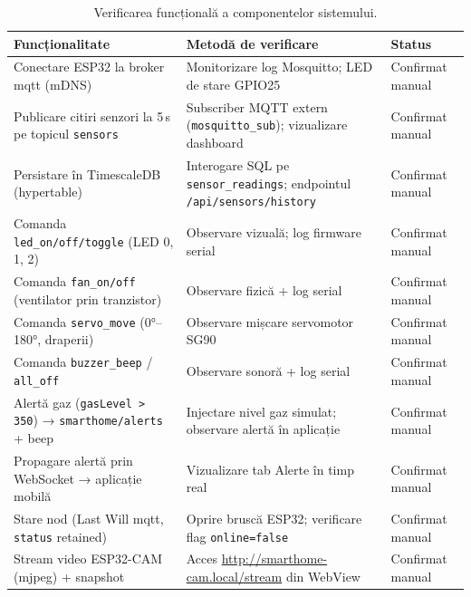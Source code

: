 \begin{table}[H]
  \centering
  \caption{Verificarea funcțională a componentelor sistemului.}
  \label{tab:verif-functionala}
  \small
  \begin{tabular}{p{4.8cm} p{5.4cm} p{2.6cm}}
    \toprule
    \textbf{Funcționalitate} & \textbf{Metodă de verificare} & \textbf{Status} \\
    \midrule
    Conectare ESP32 la broker \gls{mqtt} (mDNS) &
      Monitorizare log Mosquitto; LED de stare GPIO25 &
      Confirmat manual \\
    \addlinespace
    Publicare citiri senzori la 5\,s pe topicul \texttt{sensors} &
      Subscriber MQTT extern (\texttt{mosquitto\_sub}); vizualizare dashboard &
      Confirmat manual \\
    \addlinespace
    Persistare în TimescaleDB (hypertable) &
      Interogare SQL pe \texttt{sensor\_readings}; endpointul \texttt{/api/sensors/history} &
      Confirmat manual \\
    \addlinespace
    Comanda \texttt{led\_on/off/toggle} (LED 0, 1, 2) &
      Observare vizuală; log firmware serial &
      Confirmat manual \\
    \addlinespace
    Comanda \texttt{fan\_on/off} (ventilator prin tranzistor) &
      Observare fizică + log serial &
      Confirmat manual \\
    \addlinespace
    Comanda \texttt{servo\_move} (0°–180°, draperii) &
      Observare mișcare servomotor SG90 &
      Confirmat manual \\
    \addlinespace
    Comanda \texttt{buzzer\_beep} / \texttt{all\_off} &
      Observare sonoră + log serial &
      Confirmat manual \\
    \addlinespace
    Alertă gaz (\texttt{gasLevel > 350}) → \texttt{smarthome/alerts} + beep &
      Injectare nivel gaz simulat; observare alertă în aplicație &
      Confirmat manual \\
    \addlinespace
    Propagare alertă prin WebSocket → aplicație mobilă &
      Vizualizare tab Alerte în timp real &
      Confirmat manual \\
    \addlinespace
    Stare nod (Last Will \gls{mqtt}, \texttt{status} retained) &
      Oprire bruscă ESP32; verificare flag \texttt{online=false} &
      Confirmat manual \\
    \addlinespace
    Stream video ESP32-CAM (\gls{mjpeg}) + snapshot &
      Acces \url{http://smarthome-cam.local/stream} din WebView &
      Confirmat manual \\

\end{tabular}
\end{table}
